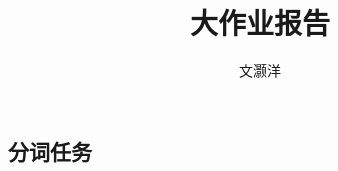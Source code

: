 \documentclass[11pt, a4paper]{article}
\begin{document}
	\begin{CJK*}{UTF8}{gbsn}
		
		\title{\bf 大作业报告}
		\author{文灏洋}
		\date{}
		\maketitle
		\setlength{\parindent}{2em}
		\newpage
		\section{分词任务}
			
	\end{CJK*}
\end{document}
